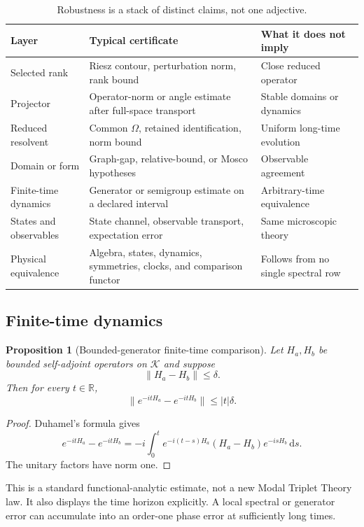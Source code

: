 \documentclass[11pt]{article}
\newtheorem{proposition}[theorem]{Proposition}
\theoremstyle{definition}
\theoremstyle{remark}
\newcommand{\cK}{\mathcal K}
\newcommand{\RR}{\mathbb R}
\newcommand{\1}{\mathbf 1}
\newcommand{\dd}{\mathrm d}
\newcommand{\MTT}{Modal Triplet Theory}
\begin{document}
\begin{table}[htbp]
\centering
\small
\begin{tabularx}{\textwidth}{L{0.20\textwidth}L{0.28\textwidth}Y}
\toprule
Layer & Typical certificate & What it does not imply \\
\midrule
Selected rank
& Riesz contour, perturbation norm, rank bound
& Close reduced operator \\
Projector
& Operator-norm or angle estimate after full-space transport
& Stable domains or dynamics \\
Reduced resolvent
& Common \(\Omega\), retained identification, norm bound
& Uniform long-time evolution \\
Domain or form
& Graph-gap, relative-bound, or Mosco hypotheses
& Observable agreement \\
Finite-time dynamics
& Generator or semigroup estimate on a declared interval
& Arbitrary-time equivalence \\
States and observables
& State channel, observable transport, expectation error
& Same microscopic theory \\
Physical equivalence
& Algebra, states, dynamics, symmetries, clocks, and comparison functor
& Follows from no single spectral row \\
\bottomrule
\end{tabularx}
\caption{Robustness is a stack of distinct claims, not one adjective.}
\label{tab:layers}
\end{table}

\subsection{Finite-time dynamics}

\begin{proposition}[Bounded-generator finite-time comparison]
\label{prop:duhamel}
Let \(H_a,H_b\) be bounded self-adjoint operators on \(\cK\) and suppose
\[
 \|H_a-H_b\|\leq\delta.
\]
Then for every \(t\in\RR\),
\[
 \|e^{-itH_a}-e^{-itH_b}\|
 \leq |t|\delta.
\]
\end{proposition}

\begin{proof}
Duhamel's formula gives
\[
 e^{-itH_a}-e^{-itH_b}
 =
 -i\int_0^t
 e^{-i(t-s)H_a}(H_a-H_b)e^{-isH_b}\,\dd s.
\]
The unitary factors have norm one.
\end{proof}

This is a standard functional-analytic estimate, not a new \MTT{} law.  It
also displays the time horizon explicitly.  A local spectral or generator
error can accumulate into an order-one phase error at sufficiently long
times.
\end{document}
